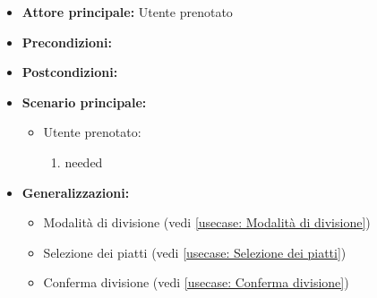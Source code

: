 \label{usecase:Divisione del conto}
\begin{itemize}
\item \textbf{Attore principale:}  Utente prenotato
\item \textbf{Precondizioni:}
\item \textbf{Postcondizioni:}
\item \textbf{Scenario principale:}
\begin{itemize}
\item  Utente prenotato:
\begin{enumerate}
\item needed
\end{enumerate}
\end{itemize}
\item \textbf{Generalizzazioni:}
\begin{itemize}
\item  Modalità di divisione (vedi \autoref{usecase: Modalità di divisione})
\item  Selezione dei piatti (vedi \autoref{usecase: Selezione dei piatti})
\item  Conferma divisione (vedi \autoref{usecase: Conferma divisione})
\end{itemize}
\end{itemize}